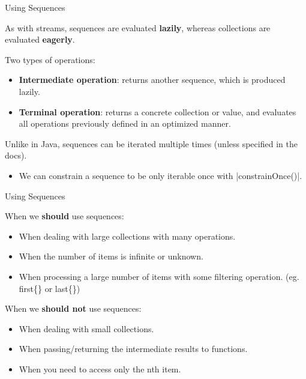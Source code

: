 \documentclass[xcolor=pdftex,dvipsnames,table]{beamer}
\newenvironment{wideitemize}{\itemize\addtolength{\itemsep}{5pt}}{\enditemize}
\begin{document}
\begin{frame}[fragile]{Using Sequences}
  \begin{wideitemize}
    \item As with streams, sequences are evaluated \textbf{lazily}, whereas collections are evaluated \textbf{eagerly}.
    \item Two types of operations:
    \begin{itemize}
      \item \textbf{Intermediate operation}: returns another sequence, which is produced lazily.
      \item \textbf{Terminal operation}: returns a concrete collection or value, and evaluates all operations previously defined in an optimized manner.
    \end{itemize}
    \item Unlike in Java, sequences can be iterated multiple times (unless specified in the docs).
    \begin{itemize}
      \item We can constrain a sequence to be only iterable once with \cverb|constrainOnce()|.
    \end{itemize}
  \end{wideitemize}
\end{frame}

\begin{frame}[fragile]{Using Sequences}
  \begin{wideitemize}
    \item When we \textbf{should} use sequences:
    \begin{itemize}
      \item When dealing with large collections with many operations.
      \item When the number of items is infinite or unknown.
      \item When processing a large number of items with some filtering operation. (eg. first\{\} or last\{\})
    \end{itemize}
    \item When we \textbf{should not} use sequences:
    \begin{itemize}
      \item When dealing with small collections.
      \item When passing/returning the intermediate results to functions.
      \item When you need to access only the nth item.
    \end{itemize}
  \end{wideitemize}

\end{frame}
\end{document}
